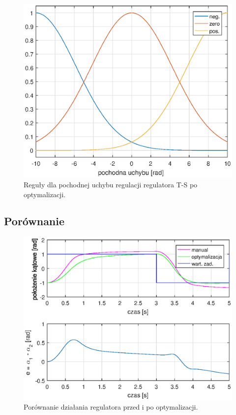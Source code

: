 \begin{figure}[h!]
	\centering
	\includegraphics[scale = 0.8]{fig/de_rules_sageno.eps}
	\caption		
	{Reguły dla pochodnej uchybu regulacji regulatora T-S po optymalizacji.}
	\label{fuzzy_sageno_de_rulles}
\end{figure}

\FloatBarrier

\subsection{Porównanie}
\begin{figure}[h!]
	\centering
	\includegraphics[scale = 0.8]{fig/por_fuzzy_sageno.eps}
	\caption		
	{Porównanie działania regulatora przed i po optymalizacji.}
	\label{fuzzy_sageno_por}
\end{figure}

